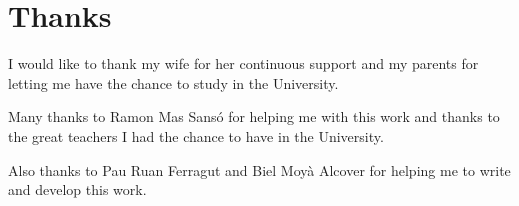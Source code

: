 \chapter*{Thanks}
I would like to thank my wife for her continuous support and my parents for letting me
have the chance to study in the University. 

Many thanks to Ramon Mas Sansó for
helping me with this work and thanks to the great teachers I had the chance to have
in the University. 

Also thanks to Pau Ru\lgem an Ferragut and Biel Moyà Alcover for helping me to write and
develop this work.
